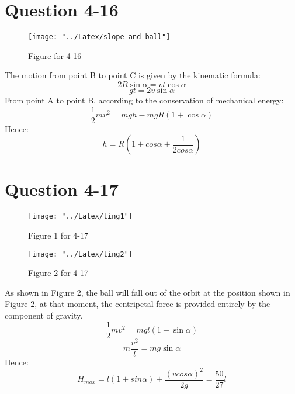 \documentclass[12pt,a4paper]{article}%
\begin{document}
	\section{Question 4-16}
	\begin{figure}[H]
		\centering
		\texttt{[image: "../Latex/slope and ball"]}
		\caption*{Figure for 4-16}
		\label{fig:slope-and-ball}
	\end{figure}
	\noindent The motion from point B to point C is given by the kinematic formula:
	\begin{equation}
		2R\sin \alpha =vt\cos \alpha 
	\end{equation}
	\begin{equation}
		gt=2v\sin \alpha 
	\end{equation}
	From point A to point B, according to the conservation of mechanical energy:
	\begin{equation}
		\frac{1}{2}mv^2=mgh-mgR\left( 1+\cos \alpha \right) 
	\end{equation}
	Hence:
	\begin{equation*}
		h=R(1+cos\alpha+\frac{1}{2cos\alpha})
	\end{equation*}
	\newpage
	\section{Question 4-17}
	\begin{figure}[H]%
		\centering
		\begin{minipage}{0.48\textwidth}
			\centering
			\texttt{[image: "../Latex/ting1"]}
			\caption*{\fontsize{10pt}{15pt}\selectfont Figure 1 for 4-17}
		\end{minipage}
		\hspace{0cm}%
		\hfill%
		\begin{minipage}{0.48\textwidth}
			\centering
			\texttt{[image: "../Latex/ting2"]}
			\caption*{\fontsize{10pt}{15pt}\selectfont Figure 2 for 4-17}
		\end{minipage}
	\end{figure}
	\noindent As shown in Figure 2, the ball will fall out of the orbit at the position shown in Figure 2, at that moment, the centripetal force is provided entirely by the component of gravity.
	\begin{equation}
		\frac{1}{2}mv^2=mgl\left( 1-\sin \alpha \right)
	\end{equation}
	\begin{equation}
		m\frac{v^2}{l}=mg\sin \alpha
	\end{equation}
	Hence:
	\begin{equation*}
		H_{max}=l(1+sin\alpha)+\frac{(vcos\alpha)^2}{2g}=\frac{50}{27}l
	\end{equation*}
\end{document}
